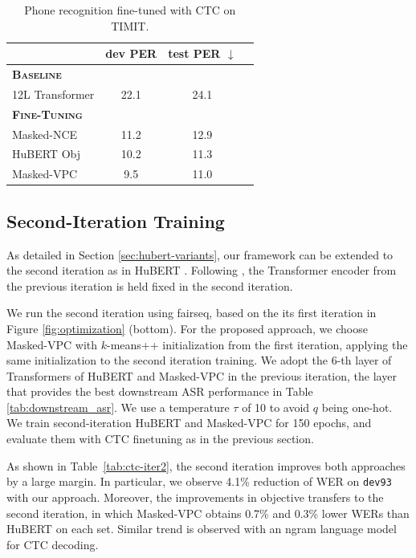 \begin{table}[t]
  \centering
  \caption{Phone recognition fine-tuned with CTC on TIMIT.}
  \label{tab:ctc2}
  \footnotesize
  \begin{tabular}{lccc}
    \toprule
                             &dev PER     &test PER $\downarrow$ \\
    \midrule
    \textbf{\textsc{Baseline}} &\\[1pt]
    12L Transformer &22.1 &24.1\\
    \midrule
    \multicolumn{2}{l}{\textbf{\textsc{Fine-Tuning}}} \\[1pt]
    Masked-NCE      &11.2  &12.9 \\
    HuBERT Obj      &10.2  &11.3 \\
    Masked-VPC      &9.5   &11.0 \\
    \bottomrule
  \end{tabular}
\end{table}

\subsection{Second-Iteration Training}

As detailed in Section \ref{sec:hubert-variants},
our framework can be extended to the second iteration
as in HuBERT \citep{hsu2021hubert}.
%
%
%
%
%
%
%
%
%
%
%
%
%
Following \citet{hsu2021hubert}, the Transformer encoder
from the previous iteration is held fixed in the second iteration.

We run the second iteration using fairseq, based on the its first iteration in Figure \ref{fig:optimization} (bottom). 
For the proposed approach, we choose Masked-VPC with $k$-means++ initialization from the first iteration, 
applying the same initialization to the second iteration training.
We adopt the 6-th layer of Transformers of HuBERT and Masked-VPC in the previous iteration, the layer that provides the best downstream ASR performance in Table \ref{tab:downstream_asr}.
We use a temperature $\tau$ of 10 to avoid $q$ being one-hot.
We train second-iteration HuBERT and Masked-VPC for 150 epochs, and evaluate them with CTC finetuning 
as in the previous section.

As shown in Table~\ref{tab:ctc-iter2}, the second iteration improves both approaches by a large margin.
In particular, we observe 4.1\% reduction of WER on \texttt{dev93} with our approach. 
Moreover, the improvements in objective transfers to the second iteration, in which 
Masked-VPC obtains 0.7\% and 0.3\% lower WERs than HuBERT on each set.
Similar trend is observed with an ngram language model for CTC decoding.


